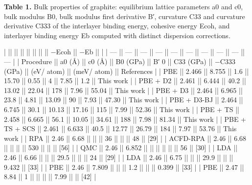 \documentclass{article}
\begin{document}
\textbf{Table 1.} Bulk properties of graphite: equilibrium lattice parameters a0 and c0, bulk modulus B0, bulk modulus first derivative B′, curvature C33 and curvature derivative C333 of the interlayer binding energy, cohesive energy Ecoh, and interlayer binding energy Eb computed with distinct dispersion corrections.

|                      ||        ||        ||            ||       ||           ||             || −Ecoh      || −Eb         ||             |
| ---                  || ---    || ---    || ---        || ---   || ---       || ---         || ---        || ---         || ---         |
| Procedure            || a0 (Å) || c0 (Å) || B0 (GPa)   || B′ 0  || C33 (GPa) || −C333 (GPa) || (eV/ atom) || (meV/ atom) || References  |
| PBE                  || 2.466  || 8.755  || 1.6        || 15.70 || 0.55      || 4           || 7.85       || 1.2         || This work   |
| PBE + D2             || 2.461  || 6.444  || 40.2       || 13.02 || 22.04     || 178         || 7.96       || 55.04       || This work   |
| PBE + D3             || 2.464  || 6.965  || 23.8       || 4.81  || 13.09     || 90          || 7.93       || 47.30       || This work   |
| PBE + D3-BJ          || 2.464  || 6.745  || 30.1       || 10.13 || 17.16     || 115         || 7.99       || 52.36       || This work   |
| PBE + TS             || 2.458  || 6.665  || 56.1       || 10.05 || 34.61     || 188         || 7.98       || 81.34       || This work   |
| PBE + TS + SCS       || 2.461  || 6.633  || 40.5       || 12.77 || 26.79     || 184         || 7.97       || 53.76       || This work   |
| RPA                  || 2.46   || 6.68   ||            ||       || 36        ||             ||            || 48          || [29]        |
| ACFD-RPA             || 2.46   || 6.68   ||            ||       ||           || 530         ||            ||             || [56]        |
| QMC                  || 2.46   || 6.852  ||            ||       ||           ||             ||            || 56          || [30]        |
| LDA                  || 2.46   || 6.66   ||            ||       || 29.5      ||             ||            || 24          || [29]        |
| LDA                  || 2.46   || 6.75   ||            ||       || 29.9      ||             ||            || 9.432       || [33]        |
| PBE                  || 2.46   || 7.809  ||            ||       || 1.2       ||             ||            || 0.399       || [33]        |
| PBE                  || 2.47   || 8.84   || 1          ||       ||           ||             || 7.99       ||             || [42]        |
\end{document}
